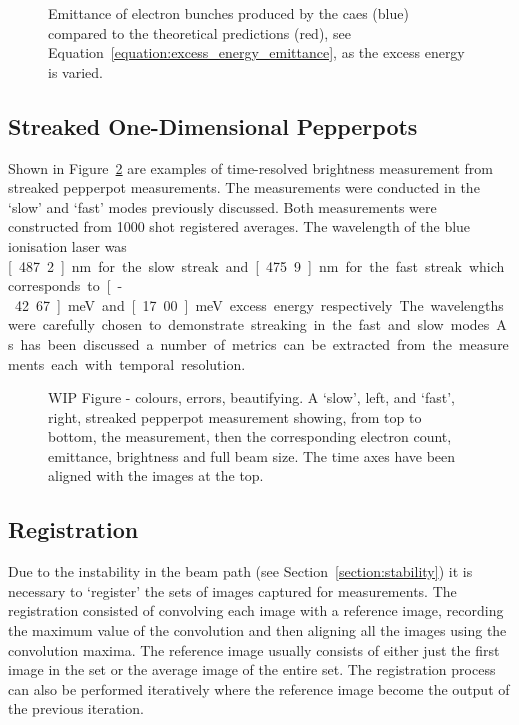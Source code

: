 \begin{figure}
    \center
    
    \caption{Emittance of electron bunches produced by the \gls{caes} (blue) compared to the theoretical predictions (red), see Equation~\ref{equation:excess_energy_emittance}, as the excess energy is varied.}
    \label{figure:emittance_vs_theory}
\end{figure}


\subsection{Streaked One-Dimensional Pepperpots}\label{section:streaked_pepperpot_results}
Shown in Figure~\ref{figure:streaks} are examples of time-resolved brightness measurement from streaked pepperpot measurements.
The measurements were conducted in the `slow' and `fast' modes previously discussed.
Both measurements were constructed from 1000 shot registered averages.
The wavelength of the blue ionisation laser was \unit[487.2]{nm} for the slow streak and \unit[475.9]{nm} for the fast streak which corresponds to \unit[-42.67]{meV} and \unit[17.00]{meV} excess energy respectively.
The wavelengths were carefully chosen to demonstrate streaking in the fast and slow modes.
As has been discussed a number of metrics can be extracted from the measurements each with temporal resolution.

\begin{figure}
    \center
    
    \caption{{\color{red}WIP Figure - colours, errors, beautifying.} A `slow', left, and `fast', right, streaked pepperpot measurement showing, from top to bottom, the measurement, then the corresponding electron count, emittance, brightness and full beam size. The time axes have been aligned with the images at the top.}
    \label{figure:streaks}
\end{figure}


\subsection{Registration}\label{section:emittance_registration}
Due to the instability in the beam path (see Section~\ref{section:stability}) it is necessary to `register' the sets of images captured for measurements.
The registration consisted of convolving each image with a reference image, recording the maximum value of the convolution and then aligning all the images using the convolution maxima.
The reference image usually consists of either just the first image in the set or the average image of the entire set.
The registration process can also be performed iteratively where the reference image become the output of the previous iteration.

